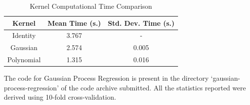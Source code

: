 \documentclass[parskip=full]{scrartcl}
\begin{document}
            \begin{table}[ht]
                \centering
                \begin{tabular}{| c | c | c |}
                \hline
                \textbf{Kernel} & \textbf{Mean Time (s.)} & \textbf{Std. Dev. Time (s.)} \\
                \hline
                \hline
                    Identity & 3.767 & - \\
                \hline
                    Gaussian & 2.574 & 0.005 \\
                \hline
                    Polynomial & 1.315 & 0.016 \\
                \hline
                \end{tabular}
                \caption{Kernel Computational Time Comparison}
                \label{tab:kernel_computational_time_comparison}
            \end{table}

        

        The code for Gaussian Process Regression is present in the directory `gaussian-process-regression' of the code archive submitted. All the statistics reported were derived using 10-fold cross-validation.
    

\end{document}
